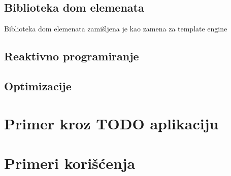 \documentclass[12pt,oneside]{memoir}
\begin{document}
\section{Biblioteka dom elemenata}
Biblioteka dom elemenata zamišljena je kao zamena za template engine
\section{Reaktivno programiranje}
\section{Optimizacije}

\chapter{Primer kroz TODO aplikaciju}
\chapter{Primeri korišćenja}


\end{document}
